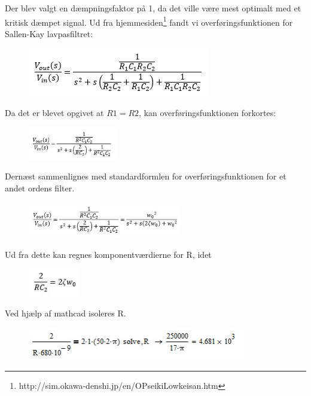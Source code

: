 Der blev valgt en dæmpningsfaktor på 1, da det ville være mest optimalt med et kritisk dæmpet signal. Ud fra hjemmesiden\footnote{http://sim.okawa-denshi.jp/en/OPseikiLowkeisan.htm} fandt vi overføringsfunktionen for Sallen-Kay lavpasfiltret:

\begin{figure}[H]
	\centering
	\includegraphics{Figurer/Hardware/ligning1}
	\label{fig:lign1}
\end{figure}

Da det er blevet opgivet at $R1=R2$, kan overføringsfunktionen forkortes: 

\begin{figure}[H]
	\centering
	\includegraphics[width=0.35\textwidth]{Figurer/Hardware/ligning2}
\end{figure}

Dernæst sammenlignes med standardformlen for overføringsfunktionen for et andet ordens filter.

\begin{figure}[H]
	\centering
	\includegraphics[width=0.6\textwidth]{Figurer/Hardware/ligning3}
	\label{fig:lign3}
\end{figure}

Ud fra dette kan regnes komponentværdierne for R, idet

\begin{figure}[H]
	\centering
	\includegraphics[width=0.2\textwidth]{Figurer/Hardware/ligning4}
	\label{fig:lign4}
\end{figure}

Ved hjælp af mathcad isoleres R.

\begin{figure}[H]
	\centering
	\includegraphics[width=0.85\textwidth]{Figurer/Hardware/ligning5}
	\label{fig:lign5}
\end{figure}

